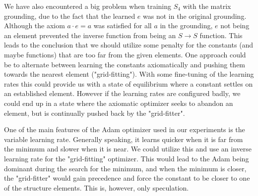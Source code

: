 We have also encountered a big problem when training $S_4$ with the matrix grounding, due to the fact that the learned $e$ was not in the original grounding. Although the axiom $a\cdot e=a$ was satisfied for all $a$ in the grounding, $e$ not being an element prevented the inverse function from being an $S\rightarrow S$ function. This leads to the conclusion that we should utilize some penalty for the constants (and maybe functions) that are too far from the given elements. One approach could be to alternate between learning the constants axiomatically and pushing them towards the nearest element ("grid-fitting"). With some fine-tuning of the learning rates this could provide us with a state of equilibrium where a constant settles on an established element. However if the learning rates are configured badly, we could end up in a state where the axiomatic optimizer seeks to abandon an element, but is continually pushed back by the "grid-fitter".

One of the main features of the Adam optimizer used in our experiments is the variable learning rate. Generally speaking, it learns quicker when it is far from the minimum and slower when it is near. We could utilize this and use an inverse learning rate for the "grid-fitting" optimizer. This would lead to the Adam being dominant during the search for the minimum, and when the minimum is closer, the "grid-fitter" would gain precedence and force the constant to be closer to one of the structure elements. This is, however, only speculation.